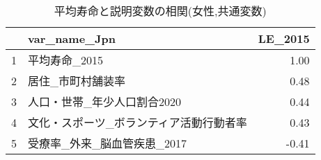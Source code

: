 \begin{table}[H]
\centering
\caption{平均寿命と説明変数の相関(女性,共通変数)}
\label{LE_d_common_f_corr.tex}
\begingroup\tiny

\begin{adjustbox}{width=.5\textwidth}
\begin{tabular}{rlr}
  \hline
 & var\_name\_Jpn & LE\_2015 \\
  \hline
1 & 平均寿命\_2015 & 1.00 \\
  2 & 居住\_市町村舗装率 & 0.48 \\
  3 & 人口・世帯\_年少人口割合2020 & 0.44 \\
  4 & 文化・スポーツ\_ボランティア活動行動者率 & 0.43 \\
  5 & 受療率\_外来\_脳血管疾患\_2017 & -0.41 \\
   \hline
\end{tabular}
\end{adjustbox}

\endgroup
\end{table}
